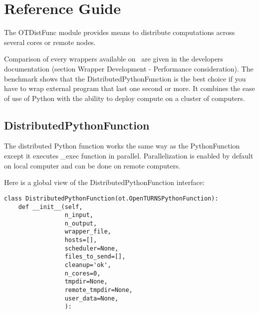 % 




\section{Reference Guide}

The OTDistFunc module provides means to distribute computations across several cores or remote nodes.

Comparison of every wrappers available on \OT\ are given in the developers documentation (section Wrapper Development - Performance consideration).
The benchmark shows that the DistributedPythonFunction is the best choice if you have to wrap external program that last one second or more. It combines the ease of use of Python with the ability to deploy compute on a cluster of computers.


% 
% 
% 
% 



\subsection{DistributedPythonFunction}

The distributed Python function works the same way as the PythonFunction except it executes \_exec function in parallel. Parallelization is enabled by default on local computer and can be done on remote computers. 

Here is a global view of the DistributedPythonFunction interface:
\begin{lstlisting}
class DistributedPythonFunction(ot.OpenTURNSPythonFunction):
    def __init__(self,
                 n_input,
                 n_output,
                 wrapper_file,
                 hosts=[],
                 scheduler=None,
                 files_to_send=[], 
                 cleanup='ok', 
                 n_cores=0,
                 tmpdir=None,
                 remote_tmpdir=None,
                 user_data=None,
                 ):
\end{lstlisting}

